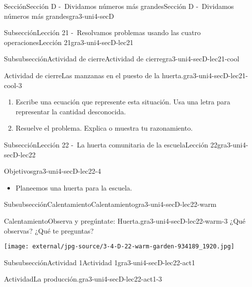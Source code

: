 \documentclass[twoside,14pt,]{extarticle}
\begin{document}
\begin{sectionptx}{Sección}{Sección D -~Dividamos números más grandes}{}{Sección D -~Dividamos números más grandes}{}{}{gra3-uni4-secD}
\begin{subsectionptx}{Subsección}{Lección 21 -~Resolvamos problemas usando las cuatro operaciones}{}{Lección 21}{}{}{gra3-uni4-secD-lec21}
\begin{subsubsectionptx}{Subsubsección}{Actividad de cierre}{}{Actividad de cierre}{}{}{gra3-uni4-secD-lec21-cool}
\begin{project}{Actividad de cierre}{Las manzanas en el puesto de la huerta.}{gra3-uni4-secD-lec21-cool-3}
%
\begin{enumerate}
\item{}Escribe una ecuación que represente esta situación. Usa una letra para representar la cantidad desconocida.%
\item{}Resuelve el problema. Explica o muestra tu razonamiento.%
\end{enumerate}
\end{project}%
\end{subsubsectionptx}
\end{subsectionptx}
%
%
\typeout{************************************************}
\typeout{************************************************}
%
\begin{subsectionptx}{Subsección}{Lección 22 -~La huerta comunitaria de la escuela}{}{Lección 22}{}{}{gra3-uni4-secD-lec22}
\begin{objectives}{Objetivos}{gra3-uni4-secD-lec22-4}
%
\begin{itemize}[label=\textbullet]
\item{}Planeemos una huerta para la escuela.%
\end{itemize}
\end{objectives}
%
%
\typeout{************************************************}
\typeout{************************************************}
%
\begin{subsubsectionptx}{Subsubsección}{Calentamiento}{}{Calentamiento}{}{}{gra3-uni4-secD-lec22-warm}
\begin{exploration}{Calentamiento}{Observa y pregúntate: Huerta.}{gra3-uni4-secD-lec22-warm-3}%
¿Qué observas? ¿Qué te preguntas?%
\begin{image}{0.125}{0.75}{0.125}{}%
\texttt{[image: external/jpg-source/3-4-D-22-warm-garden-934189\_1920.jpg]}
\end{image}%
\end{exploration}%
\end{subsubsectionptx}
%
%
\typeout{************************************************}
\typeout{************************************************}
%
\begin{subsubsectionptx}{Subsubsección}{Actividad 1}{}{Actividad 1}{}{}{gra3-uni4-secD-lec22-act1}
\begin{activity}{Actividad}{La producción.}{gra3-uni4-secD-lec22-act1-3}%
\begin{sidebyside}{2}{0}{0}{0}%

\end{sidebyside}
\end{activity}
\end{subsubsectionptx}
\end{subsectionptx}
\end{sectionptx}
\end{document}
